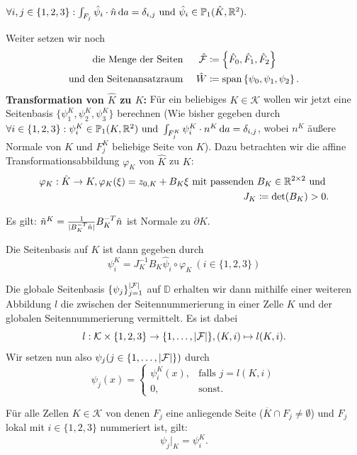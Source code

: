 \begin{Bemerkung}
	$\forall i,j\in\{1,2,3\}: \int_{F_j} \hat{\psi}_i \cdot \hat{n} \, \mathrm{d} a = \delta_{i,j} \text{ und } \hat{\psi}_i \in \mathbb{P}_1(\hat{K}, \mathbb{R}^2).$
\end{Bemerkung}

Weiter setzen wir noch 
\begin{align*}
\text{ die Menge der Seiten }&& \hat{\mathcal{F}} &\coloneqq \left\{ \hat{F}_0, \hat{F}_1, \hat{F}_2 \right\} \\
\text{und den Seitenansatzraum }&&  \hat{W} &\coloneqq \operatorname{span} \left\{ \psi_0,\psi_1, \psi_2 \right\}.
\end{align*}
\textbf{Transformation von $ \hat{K} $ zu $ K $:} Für ein beliebiges $ K \in \mathcal{K} $ wollen wir jetzt eine Seitenbasis $ \{ \psi_1^K, \psi_2^K, \psi_3^K \} $ berechnen (Wie bisher gegeben durch $ \forall i\in\{1,2,3\}: \psi_i^K\in\mathbb{P}_1(K,\mathbb{R}^2) \text{ und } \int_{F_j^K} \psi_i^K \cdot n^K \, \mathrm{d} a = \delta_{i,j} $, wobei $ n^K $ äußere Normale von  $ K $ und $ F_j^K  $ beliebige Seite von $ K $). Dazu betrachten wir die affine Transformationsabbildung $ \varphi_K $ von $ \hat{K} $ zu $ K $:
\begin{align*}
\varphi_K: \hat{K} \to K, \varphi_K(\xi) = z_{0,K} + B_K \xi \text{ mit passenden } B_K\in\mathbb{R}^{2 \times 2} \text{ und } \\
J_K \coloneqq \det(B_K) > 0.
\end{align*}
\begin{Lemma}
	Es gilt: $\tilde{n}^K = \frac{1}{| B_K^{-T} \hat{n} |} B_K^{-T} \hat{n} $ ist Normale zu $ \partial K $.
\end{Lemma}

Die Seitenbasis auf $ K $ ist dann gegeben durch 
\[ \psi_i^K = J_K^{-1}B_K \hat{\psi}_i \circ \varphi_K \ (i\in \{1,2,3\}) \]

Die globale Seitenbasis $\{\psi_j\}_{j = 1}^{| \mathcal{F} |}$ auf $ \mathbb{D}  $ erhalten wir dann mithilfe einer weiteren Abbildung $l$ die zwischen der Seitennummerierung in einer Zelle $ K $ und der globalen Seitennummerierung vermittelt. Es ist dabei
\[ l:\mathcal{K}\times \{1,2,3\} \to \{1, \dots , | \mathcal{F} | \}, (K,i) \mapsto l(K,i). \]
Wir setzen nun also $ \psi_j (j \in \{1,\dots , | \mathcal{F} |\})$ durch
\[ \psi_j(x) = 
\begin{cases}
\psi_i^K(x) , &\text{falls } j = l(K,i)\\
0,			  &\text{sonst}.
\end{cases} \]
\begin{Bemerkung}
	Für alle Zellen $ K \in \mathcal{K} $ von denen $ F_j $ eine anliegende Seite ($ \overline{K} \cap F_j \ne \emptyset $) und $ F_j $ lokal mit $ i \in \{1,2,3\} $ nummeriert ist, gilt:
	\[ \psi_j|_K = \psi_i^K. \]
\end{Bemerkung}

